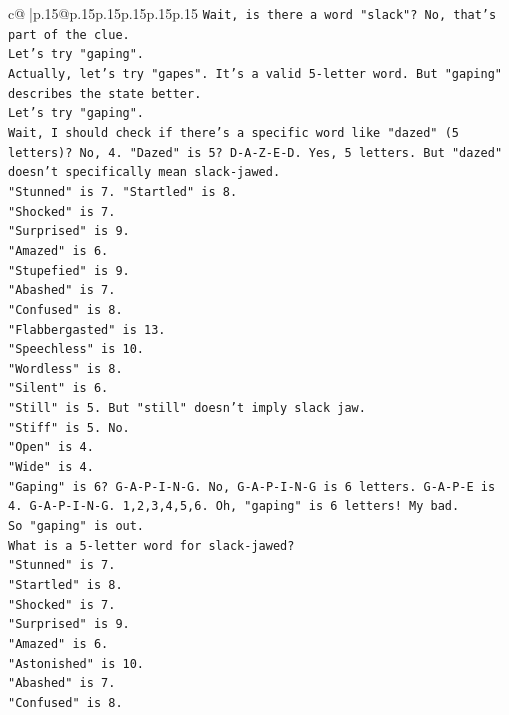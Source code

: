 \documentclass{article}
\begin{document}
{\begin{supertabular}{c@{$\;$}|p{.15\linewidth}@{}p{.15\linewidth}p{.15\linewidth}p{.15\linewidth}p{.15\linewidth}p{.15\linewidth}}
{{{\texttt{Wait, is there a word "slack"? No, that's part of the clue.} \\
\texttt{Let's try "gaping".} \\
\texttt{Actually, let's try "gapes". It's a valid 5{-}letter word. But "gaping" describes the state better.} \\
\texttt{Let's try "gaping".} \\
\texttt{Wait, I should check if there's a specific word like "dazed" (5 letters)? No, 4. "Dazed" is 5? D{-}A{-}Z{-}E{-}D. Yes, 5 letters. But "dazed" doesn't specifically mean slack{-}jawed.} \\
\texttt{"Stunned" is 7. "Startled" is 8.} \\
\texttt{"Shocked" is 7.} \\
\texttt{"Surprised" is 9.} \\
\texttt{"Amazed" is 6.} \\
\texttt{"Stupefied" is 9.} \\
\texttt{"Abashed" is 7.} \\
\texttt{"Confused" is 8.} \\
\texttt{"Flabbergasted" is 13.} \\
\texttt{"Speechless" is 10.} \\
\texttt{"Wordless" is 8.} \\
\texttt{"Silent" is 6.} \\
\texttt{"Still" is 5. But "still" doesn't imply slack jaw.} \\
\texttt{"Stiff" is 5. No.} \\
\texttt{"Open" is 4.} \\
\texttt{"Wide" is 4.} \\
\texttt{"Gaping" is 6? G{-}A{-}P{-}I{-}N{-}G. No, G{-}A{-}P{-}I{-}N{-}G is 6 letters. G{-}A{-}P{-}E is 4. G{-}A{-}P{-}I{-}N{-}G. 1,2,3,4,5,6. Oh, "gaping" is 6 letters! My bad.} \\
\texttt{So "gaping" is out.} \\
\texttt{What is a 5{-}letter word for slack{-}jawed?} \\
\texttt{"Stunned" is 7.} \\
\texttt{"Startled" is 8.} \\
\texttt{"Shocked" is 7.} \\
\texttt{"Surprised" is 9.} \\
\texttt{"Amazed" is 6.} \\
\texttt{"Astonished" is 10.} \\
\texttt{"Abashed" is 7.} \\
\texttt{"Confused" is 8.} \\
}}}
\end{supertabular}}
\end{document}
